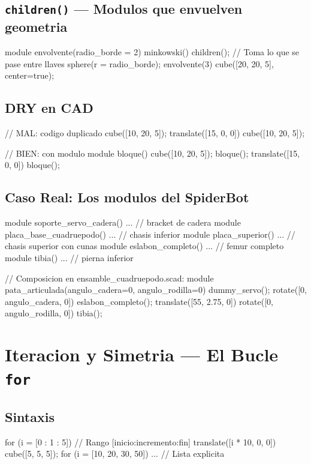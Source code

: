 \documentclass[12pt, oneside, a4paper]{report}
\newcommand{\codigo}[1]{\texttt{#1}}
\begin{document}
\section{\codigo{children()} --- Modulos que envuelven geometria}
\begin{openscad}
module envolvente(radio_borde = 2) {
    minkowski() {
        children();  // Toma lo que se pase entre llaves
        sphere(r = radio_borde);
    }
}
envolvente(3) {
    cube([20, 20, 5], center=true);
}
\end{openscad}

\section{DRY en CAD}
\begin{openscad}
// MAL: codigo duplicado
cube([10, 20, 5]);
translate([15, 0, 0]) cube([10, 20, 5]);

// BIEN: con modulo
module bloque() { cube([10, 20, 5]); }
bloque();
translate([15, 0, 0]) bloque();
\end{openscad}

\section{Caso Real: Los modulos del SpiderBot}
\begin{openscad}
module soporte_servo_cadera() { ... }   // bracket de cadera
module placa_base_cuadruepodo() { ... } // chasis inferior
module placa_superior() { ... }         // chasis superior con cunas
module eslabon_completo() { ... }       // femur completo
module tibia() { ... }                  // pierna inferior

// Composicion en ensamble_cuadruepodo.scad:
module pata_articulada(angulo_cadera=0, angulo_rodilla=0) {
    dummy_servo();
    rotate([0, angulo_cadera, 0])
        eslabon_completo();
    translate([55, 2.75, 0])
        rotate([0, angulo_rodilla, 0])
            tibia();
}
\end{openscad}

\chapter{Iteracion y Simetria --- El Bucle \codigo{for}}

\section{Sintaxis}
\begin{openscad}
for (i = [0 : 1 : 5]) {             // Rango [inicio:incremento:fin]
    translate([i * 10, 0, 0])
        cube([5, 5, 5]);
}
for (i = [10, 20, 30, 50]) { ... }  // Lista explicita
\end{openscad}
\end{document}
